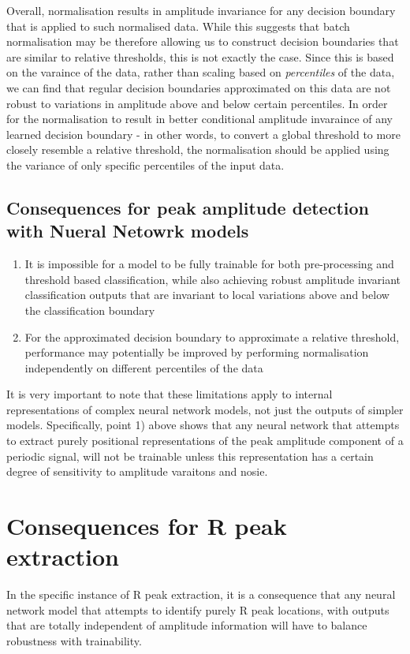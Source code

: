 \documentclass[9pt,conference]{IEEEtran}
\begin{document}
Overall, normalisation results in amplitude invariance for any decision boundary that is applied to such normalised data. While this suggests that batch normalisation may be therefore allowing us to construct decision boundaries that are similar to relative thresholds, this is not exactly the case. Since this is based on the varaince of the data, rather than scaling based on \textit{percentiles} of the data, we can find that regular decision boundaries approximated on this data are not robust to variations in amplitude above and below certain percentiles. In order for the normalisation to result in better conditional amplitude invaraince of any learned decision boundary - in other words, to convert a global threshold to more closely resemble a relative threshold, the normalisation should be applied using the variance of only specific percentiles of the input data.


\subsection{Consequences for peak amplitude detection with Nueral Netowrk models}

\begin{enumerate}
    \item It is impossible for a model to be fully trainable for both pre-processing and threshold based classification, while also achieving robust amplitude invariant classification outputs that are invariant to local variations above and below the classification boundary
    \item For the approximated decision boundary to approximate a relative threshold, performance may potentially be improved by performing normalisation independently on different percentiles of the data 
\end{enumerate}

It is very important to note that these limitations apply to internal representations of complex neural network models, not just the outputs of simpler models. Specifically, point 1) above shows that any neural network that attempts to extract purely positional representations of the peak amplitude component of a periodic signal, will not be trainable unless this representation has a certain degree of sensitivity to amplitude varaitons and nosie.

\section{Consequences for R peak extraction}
In the specific instance of R peak extraction, it is a consequence that any neural network model that attempts to identify purely R peak locations, with outputs that are totally independent of amplitude information will have to balance robustness with trainability.
\end{document}
